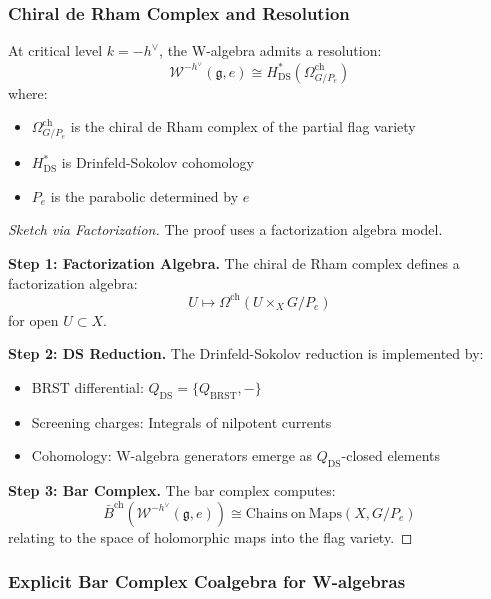\subsubsection{Chiral de Rham Complex and Resolution}

\begin{theorem}\label{thm:w-cdr}
At critical level $k = -h^\vee$, the W-algebra admits a resolution:
\[
\mathcal{W}^{-h^\vee}(\mathfrak{g}, e) \cong H^*_{\mathrm{DS}}(\Omega^{\mathrm{ch}}_{G/P_e})
\]
where:
\begin{itemize}
\item $\Omega^{\mathrm{ch}}_{G/P_e}$ is the chiral de Rham complex of the partial flag variety
\item $H^*_{\mathrm{DS}}$ is Drinfeld-Sokolov cohomology
\item $P_e$ is the parabolic determined by $e$
\end{itemize}
\end{theorem}

\begin{proof}[Sketch via Factorization]
The proof uses a factorization algebra model.

\textbf{Step 1: Factorization Algebra.} The chiral de Rham complex defines a factorization algebra:
\[
U \mapsto \Omega^{\mathrm{ch}}(U \times_{X} G/P_e)
\]
for open $U \subset X$.

\textbf{Step 2: DS Reduction.} The Drinfeld-Sokolov reduction is implemented by:
\begin{itemize}
\item BRST differential: $Q_{\mathrm{DS}} = \{Q_{\mathrm{BRST}}, -\}$
\item Screening charges: Integrals of nilpotent currents
\item Cohomology: W-algebra generators emerge as $Q_{\mathrm{DS}}$-closed elements
\end{itemize}

\textbf{Step 3: Bar Complex.} The bar complex computes:
\[
\bar{B}^{\mathrm{ch}}(\mathcal{W}^{-h^\vee}(\mathfrak{g}, e)) \cong \mathrm{Chains\ on\ Maps}(X, G/P_e)
\]
relating to the space of holomorphic maps into the flag variety.
\end{proof}

\subsubsection{Explicit Bar Complex Coalgebra for W-algebras}

